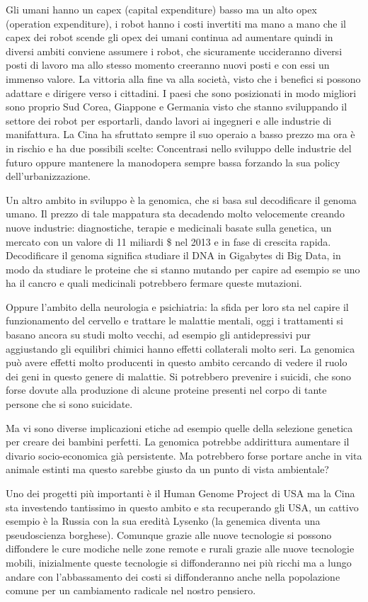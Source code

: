 \documentclass[a4page, 11pt]{article}
\begin{document}
Gli umani hanno un capex (capital expenditure) basso ma un alto opex
(operation expenditure), i robot hanno i costi invertiti ma mano a mano
che il capex dei robot scende gli opex dei umani continua ad aumentare
quindi in diversi ambiti conviene assumere i robot, che sicuramente
uccideranno diversi posti di lavoro ma allo stesso momento creeranno
nuovi posti e con essi un immenso valore. La vittoria alla fine va alla
società, visto che i benefici si possono adattare e dirigere verso i
cittadini. I paesi che sono posizionati in modo migliori sono proprio
Sud Corea, Giappone e Germania visto che stanno sviluppando il settore
dei robot per esportarli, dando lavori ai ingegneri e alle industrie di
manifattura. La Cina ha sfruttato sempre il suo operaio a basso prezzo
ma ora è in rischio e ha due possibili scelte: Concentrasi nello
sviluppo delle industrie del futuro oppure mantenere la manodopera
sempre bassa forzando la sua policy dell'urbanizzazione.

Un altro ambito in sviluppo è la genomica, che si basa sul decodificare
il genoma umano. Il prezzo di tale mappatura sta decadendo molto
velocemente creando nuove industrie: diagnostiche, terapie e medicinali
basate sulla genetica, un mercato con un valore di 11 miliardi \$ nel
2013 e in fase di crescita rapida. Decodificare il genoma significa
studiare il DNA in Gigabytes di Big Data, in modo da studiare le
proteine che si stanno mutando per capire ad esempio se uno ha il cancro
e quali medicinali potrebbero fermare queste mutazioni.

Oppure l'ambito della neurologia e psichiatria: la sfida per loro sta
nel capire il funzionamento del cervello e trattare le malattie mentali,
oggi i trattamenti si basano ancora su studi molto vecchi, ad esempio
gli antidepressivi pur aggiustando gli equilibri chimici hanno effetti
collaterali molto seri. La genomica può avere effetti molto producenti
in questo ambito cercando di vedere il ruolo dei geni in questo genere
di malattie. Si potrebbero prevenire i suicidi, che sono forse dovute
alla produzione di alcune proteine presenti nel corpo di tante persone
che si sono suicidate.

Ma vi sono diverse implicazioni etiche ad esempio quelle della selezione
genetica per creare dei bambini perfetti. La genomica potrebbe
addirittura aumentare il divario socio-economica già persistente. Ma
potrebbero forse portare anche in vita animale estinti ma questo sarebbe
giusto da un punto di vista ambientale?

Uno dei progetti più importanti è il Human Genome Project di USA ma la
Cina sta investendo tantissimo in questo ambito e sta recuperando gli
USA, un cattivo esempio è la Russia con la sua eredità Lysenko (la
genemica diventa una pseudoscienza borghese). Comunque grazie alle nuove
tecnologie si possono diffondere le cure modiche nelle zone remote e
rurali grazie alle nuove tecnologie mobili, inizialmente queste
tecnologie si diffonderanno nei più ricchi ma a lungo andare con
l'abbassamento dei costi si diffonderanno anche nella popolazione comune
per un cambiamento radicale nel nostro pensiero.
\end{document}
